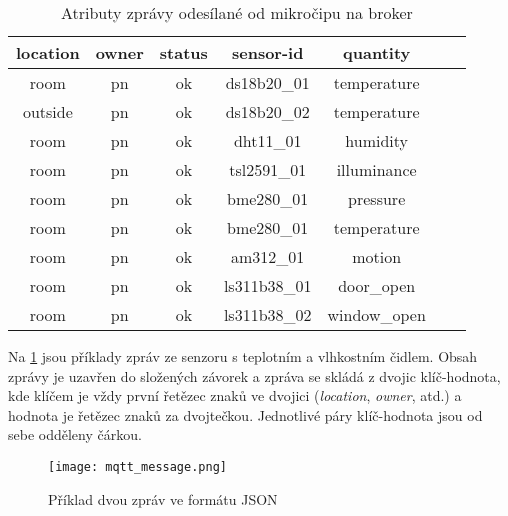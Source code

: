\begin{table}[h]
\centering
 \begin{tabular}{|c|c|c|c|c|c|c|} 
 \hline
  location & owner & status & sensor-id & quantity  \\
 \hline\hline
 room & pn & ok & ds18b20\_01 & temperature \\ 
 outside & pn & ok & ds18b20\_02 & temperature \\
 room & pn & ok & dht11\_01 & humidity \\
 room & pn & ok & tsl2591\_01 & illuminance \\
 room & pn & ok & bme280\_01 & pressure \\
 room & pn & ok & bme280\_01 & temperature \\
 room & pn & ok & am312\_01 & motion \\
 room & pn & ok & ls311b38\_01 & door\_open \\
 room & pn & ok & ls311b38\_02 & window\_open \\
 \hline
 \end{tabular}
 \caption{Atributy zprávy odesílané od mikročipu na broker}
 \label{tab:mqtt_msg_structure}
\end{table}

Na \cref{fig:mqtt_message} jsou příklady zpráv ze senzoru s teplotním a vlhkostním čidlem. Obsah zprávy je uzavřen do složených závorek a zpráva se skládá z dvojic klíč-hodnota, kde klíčem je vždy první řetězec znaků ve dvojici (\textit{location}, \textit{owner}, atd.) a hodnota je řetězec znaků za dvojtečkou. Jednotlivé páry klíč-hodnota jsou od sebe odděleny čárkou.

\begin{figure}[H]
  \centering
  \texttt{[image: mqtt\_message.png]}
  \caption{Příklad dvou zpráv ve formátu JSON}
  \label{fig:mqtt_message}
\end{figure}

